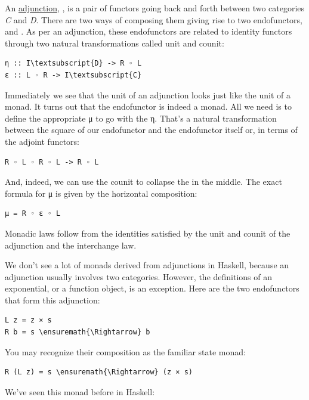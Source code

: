 An \hyperref[adjunctions]{adjunction},
, is a pair of functors going back and forth between two
categories \emph{C} and \emph{D}. There are two ways of composing them
giving rise to two endofunctors,  and .
As per an adjunction, these endofunctors are related to identity
functors through two natural transformations called unit and counit:

\begin{Verbatim}[commandchars=\\\{\}]
η :: I\textsubscript{D} -> R ◦ L
ε :: L ◦ R -> I\textsubscript{C}
\end{Verbatim}
Immediately we see that the unit of an adjunction looks just like the
unit of a monad. It turns out that the endofunctor  is
indeed a monad. All we need is to define the appropriate μ to go with
the η. That's a natural transformation between the square of our
endofunctor and the endofunctor itself or, in terms of the adjoint
functors:

\begin{Verbatim}[commandchars=\\\{\}]
R ◦ L ◦ R ◦ L -> R ◦ L
\end{Verbatim}
And, indeed, we can use the counit to collapse the  in
the middle. The exact formula for μ is given by the horizontal
composition:

\begin{Verbatim}[commandchars=\\\{\}]
μ = R ◦ ε ◦ L
\end{Verbatim}
Monadic laws follow from the identities satisfied by the unit and counit
of the adjunction and the interchange law.

We don't see a lot of monads derived from adjunctions in Haskell,
because an adjunction usually involves two categories. However, the
definitions of an exponential, or a function object, is an exception.
Here are the two endofunctors that form this adjunction:

\begin{Verbatim}[commandchars=\\\{\}]
L z = z × s
R b = s \ensuremath{\Rightarrow} b
\end{Verbatim}
You may recognize their composition as the familiar state monad:

\begin{Verbatim}[commandchars=\\\{\}]
R (L z) = s \ensuremath{\Rightarrow} (z × s)
\end{Verbatim}
We've seen this monad before in Haskell:

